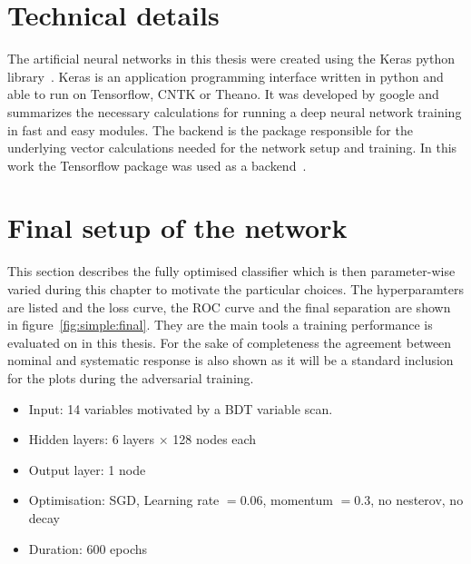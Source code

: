 \section{Technical details}
\label{sec:technicals}

The artificial neural networks in this thesis were created using the Keras python library~\cite{chollet2015keras}.
Keras is an application programming interface written in python and able to run on Tensorflow, CNTK or Theano. It was developed by google and summarizes the necessary calculations for running a deep neural network training in fast and easy modules.
The backend is the package responsible for the underlying vector calculations needed for the network setup and training. In this work the Tensorflow package was used as a backend~\cite{tensorflow2015-whitepaper}.

\section{Final setup of the network}
\label{sec:simplesetup}

This section describes the fully optimised classifier which is then parameter-wise varied during this chapter to motivate the particular choices.
The hyperparamters are listed and the loss curve, the ROC curve and the final separation are shown in figure~\ref{fig:simple:final}. They are the main tools a training performance is evaluated on in this thesis. For the sake of completeness the agreement between nominal and systematic response is also shown as it will be a standard inclusion for the plots during the adversarial training.


\begin{itemize}
\item Input: \num{14} variables motivated by a BDT variable scan.
\item Hidden layers: \num{6} \ELU layers $\times$ \num{128} nodes each
\item Output layer: \num{1} \SIGMOID node
\item Optimisation: SGD, Learning rate $=0.06$, momentum $=0.3$, no nesterov, no decay
\item Duration: 600 epochs
\end{itemize}

